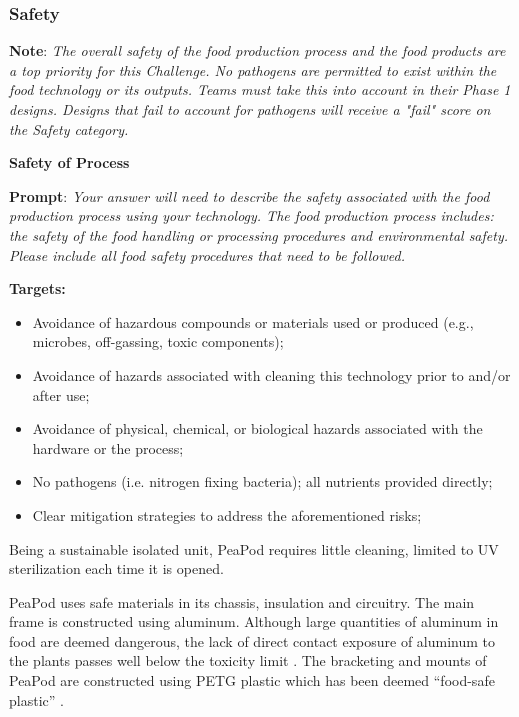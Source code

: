 \documentclass{../tex/report}
\begin{document}
\newpage

\subsubsection{Safety}
\label{sec:safety}

\textbf{Note}: \textit{The overall safety of the food production process and the food products are a top priority for this Challenge. No pathogens are permitted to exist within the food technology or its outputs.  Teams must take this into account in their Phase 1 designs. Designs that fail to account for pathogens will receive a "fail" score on the Safety category.}

\textbf{Safety of Process}
\label{sec:safety-process}

\textbf{Prompt}: \textit{Your answer will need to describe the safety associated with the food production process using your technology. The food production process includes: the safety of the food handling or processing procedures and environmental safety. Please include all food safety procedures that need to be followed.}

\textbf{Targets:}
\begin{itemize}
    \item Avoidance of hazardous compounds or materials used or produced (e.g., microbes, off-gassing, toxic components);
    \item Avoidance of hazards associated with cleaning this technology prior to and/or after use;
    \item Avoidance of physical, chemical, or biological hazards associated with the hardware or the process;
    \item No pathogens (i.e. nitrogen fixing bacteria); all nutrients provided directly;
    \item Clear mitigation strategies to address the aforementioned risks;
\end{itemize}


Being a sustainable isolated unit, PeaPod requires little cleaning, limited to UV sterilization each time it is opened.

PeaPod uses safe materials in its chassis, insulation and circuitry. 
The main frame is constructed using aluminum. Although large quantities of aluminum in food are deemed dangerous, the lack of direct contact exposure of aluminum to the plants passes well below the toxicity limit \cite{aluminum}.
The bracketing and mounts of PeaPod are constructed using PETG plastic which has been deemed “food-safe plastic” \cite{petg}.
\end{document}
